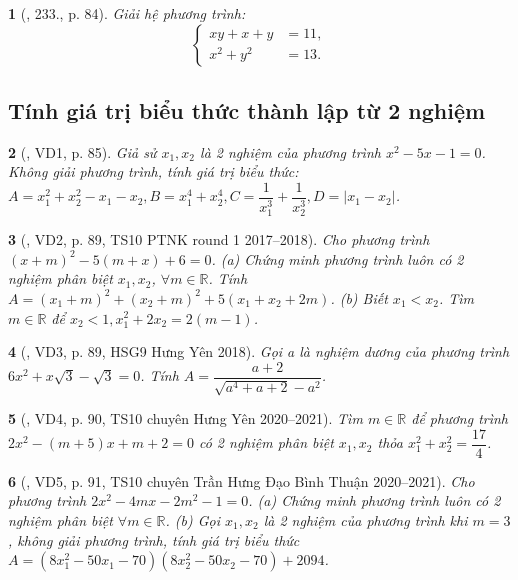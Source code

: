 \documentclass{article}
\newtheorem{baitoan}{}
\begin{document}
\begin{baitoan}[\cite{Tuyen_Toan_9_old}, 233., p. 84]
	Giải hệ phương trình:
	\begin{equation*}
		\left\{\begin{split}
			xy + x + y &= 11,\\
			x^2 + y^2 &= 13.
		\end{split}\right.
	\end{equation*}
\end{baitoan}

\subsection{Tính giá trị biểu thức thành lập từ 2 nghiệm}

\begin{baitoan}[\cite{Thu_Viet_Minh_ptb2}, VD1, p. 85]
	Giả sử $x_1,x_2$ là 2 nghiệm của phương trình $x^2 - 5x - 1 = 0$. Không giải phương trình, tính giá trị biểu thức: $A = x_1^2 + x_2^2 - x_1 - x_2,B = x_1^4 + x_2^4,C = \dfrac{1}{x_1^3} + \dfrac{1}{x_2^3},D = |x_1 - x_2|$.
\end{baitoan}

\begin{baitoan}[\cite{Thu_Viet_Minh_ptb2}, VD2, p. 89, TS10 PTNK round 1 2017--2018]
	Cho phương trình $(x + m)^2 - 5(m + x) + 6 = 0$. (a) Chứng minh phương trình luôn có 2 nghiệm phân biệt $x_1,x_2$, $\forall m\in\mathbb{R}$. Tính $A = (x_1 + m)^2 + (x_2 + m)^2 + 5(x_1 + x_2 + 2m)$. (b) Biết $x_1 < x_2$. Tìm $m\in\mathbb{R}$ để $x_2 < 1,x_1^2 + 2x_2 = 2(m - 1)$.
\end{baitoan}

\begin{baitoan}[\cite{Thu_Viet_Minh_ptb2}, VD3, p. 89, HSG9 Hưng Yên 2018]
	Gọi a là nghiệm dương của phương trình $6x^2 + x\sqrt{3} - \sqrt{3} = 0$. Tính $A = \dfrac{a + 2}{\sqrt{a^4 + a + 2} - a^2}$.
\end{baitoan}

\begin{baitoan}[\cite{Thu_Viet_Minh_ptb2}, VD4, p. 90, TS10 chuyên Hưng Yên 2020--2021]
	Tìm $m\in\mathbb{R}$ để phương trình $2x^2 - (m + 5)x + m + 2 = 0$ có 2 nghiệm phân biệt $x_1,x_2$ thỏa $x_1^2 + x_2^2 = \dfrac{17}{4}$.
\end{baitoan}

\begin{baitoan}[\cite{Thu_Viet_Minh_ptb2}, VD5, p. 91, TS10 chuyên Trần Hưng Đạo Bình Thuận 2020--2021]
	Cho phương trình $2x^2 - 4mx - 2m^2 - 1 = 0$. (a) Chứng minh phương trình luôn có 2 nghiệm phân biệt $\forall m\in\mathbb{R}$. (b) Gọi $x_1,x_2$ là 2 nghiệm của phương trình khi $m = 3$, không giải phương trình, tính giá trị biểu thức $A = (8x_1^2 - 50x_1 - 70)(8x_2^2 - 50x_2 - 70) + 2094$.
\end{baitoan}
\end{document}
